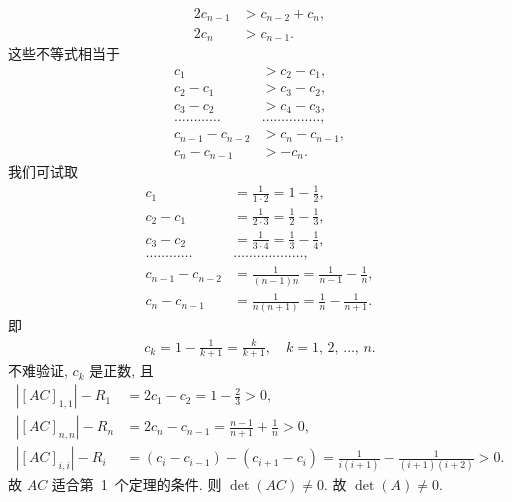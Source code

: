 \begin{example}
\begin{align*}
        2c_{n-1} & > c_{n-2} + c_n, \\
        2c_n     & > c_{n-1}.
    \end{align*}
    这些不等式相当于
    \begin{align*}
        c_1               & > c_2 - c_1,     \\
        c_2 - c_1         & > c_3 - c_2,     \\
        c_3 - c_2         & > c_4 - c_3,     \\
        \dots \dots \dots \dots
                          &
        \dots \dots \dots \dots \dots,       \\
        c_{n-1} - c_{n-2} & > c_n - c_{n-1}, \\
        c_n - c_{n-1}     & > -c_n.
    \end{align*}
    我们可试取
    \begin{align*}
        c_1               &
        = \frac{1}{1 \cdot 2}
        = 1 - \frac{1}{2},                   \\
        c_2 - c_1         &
        = \frac{1}{2 \cdot 3}
        = \frac{1}{2} - \frac{1}{3},         \\
        c_3 - c_2         &
        = \frac{1}{3 \cdot 4}
        = \frac{1}{3} - \frac{1}{4},         \\
        \dots \dots \dots \dots
                          &
        \dots \dots \dots \dots \dots \dots, \\
        c_{n-1} - c_{n-2} &
        = \frac{1}{(n-1)n}
        = \frac{1}{n-1} - \frac{1}{n},       \\
        c_n - c_{n-1}     &
        = \frac{1}{n(n+1)}
        = \frac{1}{n} - \frac{1}{n+1}.
    \end{align*}
    即
    \begin{align*}
        c_k = 1 - \frac{1}{k+1} = \frac{k}{k+1},
        \quad
        \text{\(k = 1\), \(2\), \(\dots\), \(n\)}.
    \end{align*}
    不难验证, \(c_k\) 是正数, 且
    \begin{align*}
        |[AC]_{1,1}| - R_1
         & = 2c_1 - c_2
        = 1 - \frac{2}{3} > 0,                 \\
        |[AC]_{n,n}| - R_n
         & = 2c_n - c_{n-1}
        = \frac{n-1}{n+1} + \frac{1}{n} > 0,   \\
        |[AC]_{i,i}| - R_i
         & = (c_i - c_{i-1}) - (c_{i+1} - c_i)
        = \frac{1}{i(i+1)} - \frac{1}{(i+1)(i+2)} > 0.
    \end{align*}
    故 \(AC\) 适合第~1~个定理的条件.
    则 \(\det {(AC)} \neq 0\).
    故 \(\det {(A)} \neq 0\).
\end{example}

